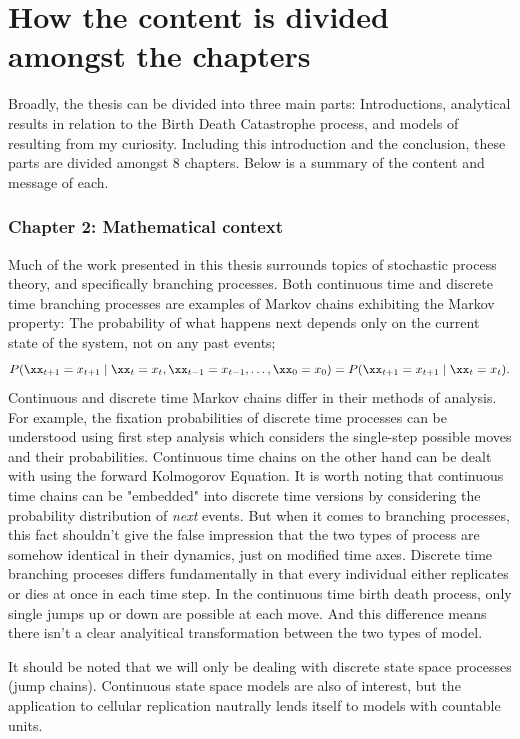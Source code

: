 \section{How the content is divided amongst the chapters}

Broadly, the thesis can be divided into three main parts: Introductions,  analytical results in relation to the Birth Death Catastrophe process,  and models of resulting from my curiosity.  Including this introduction and the conclusion,  these parts are divided amongst 8 chapters.  Below is a summary of the content and message of each.


\subsubsection{Chapter 2: Mathematical context}


Much of the work presented in this thesis surrounds topics of stochastic process theory,  and specifically branching processes.  Both continuous time and discrete time branching processes are examples of Markov chains exhibiting the Markov property: The probability of what happens next depends only on the current state of the system,   not on any past events;
\[
P(\xx_{t+1} = x_{t+1} \mid \xx_t = x_t, \xx_{t-1} = x_{t-1}, \ldots, \xx_0 = x_0) = P(\xx_{t+1} = x_{t+1} \mid \xx_t = x_t).
\] 
Continuous and discrete time Markov chains differ in their methods of analysis.  For example,  the fixation probabilities of discrete time processes can be understood using first step analysis which considers the single-step possible moves and their probabilities.  Continuous time chains on the other hand can be dealt with using the forward Kolmogorov Equation.  It is worth noting that continuous time chains can be "embedded" into discrete time versions by considering the probability distribution of \textit{next} events.  But when it comes to branching processes,  this fact shouldn't give the false impression that the two types of process are somehow identical in their dynamics,  just on modified time axes. Discrete time branching proceses differs fundamentally in that every individual either replicates or dies at once in each time step.  In the continuous time birth death process,  only single jumps up or down are possible at each move.  And this difference means there isn't a clear analyitical transformation between the two types of model.\par
It should be noted that we will only be dealing with discrete state space processes (jump chains).  Continuous state space models are also of interest, but the application to cellular replication nautrally lends itself to models with countable units. 
\vspace{10pt}

